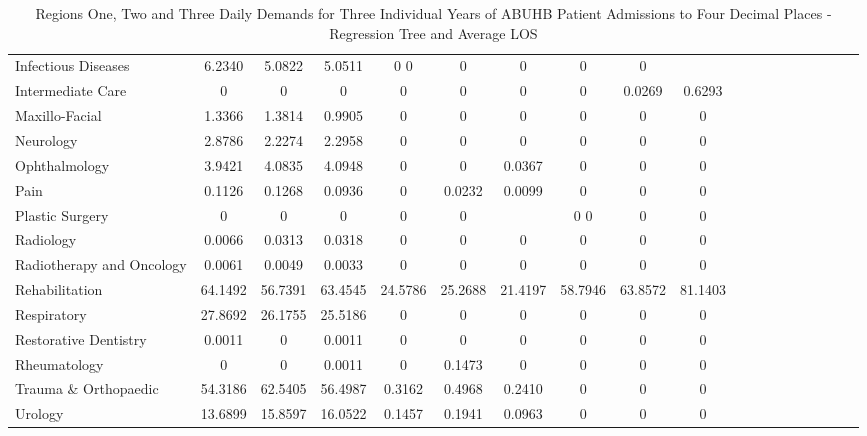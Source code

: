 \documentclass[thesis.tex]{subfiles}
\begin{document}
\begin{landscape}
\begin{table}[h!]
{\begin{tabular}{lcccccccccccccccccc}
Infectious Diseases&	6.2340&	5.0822&	5.0511	&0	0&	0&	0&	0&	0\\
Intermediate Care&	0&	0&	0&	0&	0&	0&	0&	0.0269&	0.6293\\
Maxillo-Facial&	1.3366	&1.3814&	0.9905	&0&	0&	0&	0&	0&	0\\
Neurology&	2.8786	&2.2274&	2.2958&	0&	0&	0&	0&	0&	0\\
Ophthalmology&	3.9421	&4.0835&	4.0948&	0&	0&0.0367&	0&	0&	0\\
Pain&	0.1126	&0.1268&	0.0936	&0&0.0232&	0.0099&	0&	0&0\\
Plastic Surgery&	0&	0&	0&	0&	0&	&0	0&	0&	0\\
Radiology	&0.0066	&0.0313	&0.0318&	0&	0&	0&	0&	0&	0\\
Radiotherapy and Oncology	&0.0061	&0.0049	&0.0033&	0&0&	0&	0&	0&	0\\
Rehabilitation	&64.1492&	56.7391&63.4545	&24.5786&	25.2688	&21.4197&	58.7946&	63.8572	&81.1403\\
Respiratory	&27.8692&	26.1755&	25.5186&	0&	0&	0&	0&	0&	0\\
Restorative Dentistry&	0.0011&	0&	0.0011	&0&	0&	0&	0&	0&	0\\
Rheumatology&	0&	0&	0.0011	&0&	0.1473&	0&	0&	0&	0\\
Trauma \& Orthopaedic	&54.3186	&62.5405	&56.4987	&0.3162	&0.4968	&0.2410&	0&	0&	0\\
Urology&	13.6899&	15.8597&	16.0522&0.1457	&0.1941	&0.0963&	0&	0&	0\\\bottomrule
\end{tabular}  } 
\caption{Regions One, Two and Three Daily Demands for Three Individual Years of ABUHB Patient Admissions to Four Decimal Places - Regression Tree and Average LOS}
    \label{apptab:LinkedDemands2a}
\end{table}

\begin{table}[h!]
    \centering{}
\end{table}
\end{landscape}
\end{document}
